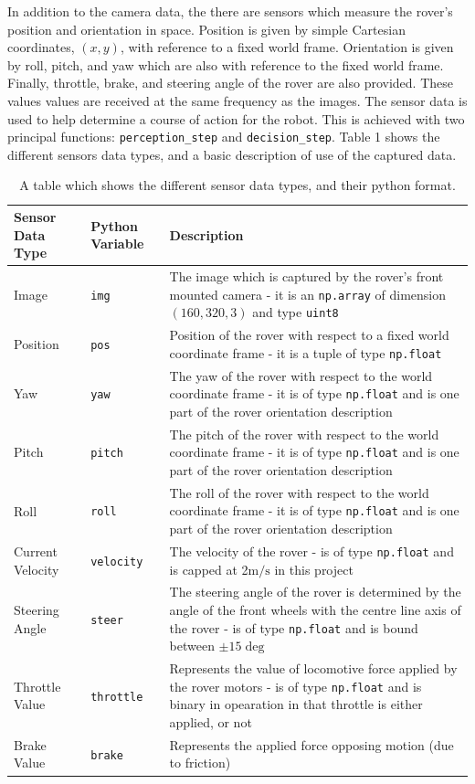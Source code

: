 \documentclass[a4paper]{article}
\begin{document}
In addition to the camera data, the there are sensors which measure the rover's position and orientation in space. Position is given by simple Cartesian coordinates, $(x, y)$, with reference to a fixed world frame. Orientation is given by roll, pitch, and yaw which are also with reference to the fixed world frame. Finally, throttle, brake, and steering angle of the rover are also provided. These values values are received at the same frequency as the images. The sensor data is used to help determine a course of action for the robot. This is achieved with two principal functions: \verb|perception_step| and \verb|decision_step|. Table 1 shows the different sensors data types, and a basic description of use of the captured data. 

\begin{table}
\caption{A table which shows the different sensor data types, and their python format.}
\begin{tabular}{llp{10cm}}
\toprule
\textbf{Sensor Data Type} & \textbf{Python Variable} & \textbf{Description}\\
\midrule
Image & \verb|img| & The image which is captured by the rover's front mounted camera - it is an \verb|np.array| of dimension $(160,320,3)$ and type \verb|uint8|\\
Position & \verb|pos| & Position of the rover with respect to a fixed world coordinate frame - it is a tuple of type \verb|np.float| \\
Yaw & \verb|yaw| & 	The yaw of the rover with respect to the world coordinate frame - it is of type \verb|np.float| and is one part of the rover orientation description\\
Pitch & \verb|pitch| & The pitch of the rover with respect to the world coordinate frame - it is of type \verb|np.float| and is one part of the rover orientation description\\
Roll & \verb|roll| & The roll of the rover with respect to the world coordinate frame - it is of type \verb|np.float| and is one part of the rover orientation description\\
Current Velocity & \verb|velocity| & The velocity of the rover - is of type \verb|np.float| and is capped at 2$\si{\meter\per\second}$ in this project\\
Steering Angle & \verb|steer| & The steering angle of the rover is determined by the angle of the front wheels with the centre line axis of the rover - is of type \verb|np.float| and is bound between $\pm 15 \si{\deg}$\\
Throttle Value & \verb|throttle| & Represents the value of locomotive force applied by the rover motors - is of type \verb|np.float| and is binary in opearation in that throttle is either applied, or not\\
Brake Value & \verb|brake| & Represents the applied force opposing motion (due to friction)
\bottomrule
\end{tabular}
\end{table}
\end{document}
